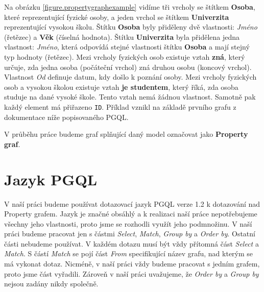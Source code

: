 Na obrázku \ref{figure.propertygraphexample} vidíme tři vrcholy se štítkem \textbf{Osoba}, které reprezentující fyzické osoby, a jeden vrchol se štítkem \textbf{Univerzita} reprezentující vysokou školu.
Štítku \textbf{Osoba} byly přiděleny dvě vlastnosti: \textit{Jméno} (řetězec) a \textbf{Věk} (číselná hodnota).
Štítku \textbf{Univerzita} byla přidělena jedna vlastnost: \textit{Jméno}, která odpovídá stejné vlastnosti štítku \textbf{Osoba} a mají stejný typ hodnoty (řetězec).
Mezi vrcholy fyzických osob existuje vztah \textbf{zná}, který určuje, zda jedna osoba (počáteční vrchol) zná druhou osobu (koncový vrchol).
Vlastnost \textit{Od} definuje datum, kdy došlo k poznání osoby.
Mezi vrcholy fyzických osob a vysokou školou existuje vztah \textbf{je studentem}, který říká, zda osoba studuje na dané vysoké škole.
Tento vztah nemá žádnou vlastnost.
Samotně pak každý element má přiřazeno \texttt{ID}.
Příklad vznikl na základě prvního grafu z dokumentace níže popisovaného PGQL.

V průběhu práce budeme graf splňující daný model označovat jako \textbf{Property graf}.

\section{Jazyk PGQL}
\label{req.pgql}

V naší práci budeme používat dotazovací jazyk PGQL \citep{pgql} verze 1.2 k dotazování nad Property grafem.
Jazyk je značné obsáhlý a k realizaci naší práce nepotřebujeme všechny jeho vlastnosti, proto jsme se rozhodli využít jeho podmnožinu.
V naší práci budeme pracovat jen s částmi \textit{Select}, \textit{Match}, \textit{Group by} a \textit{Order by}.
Ostatní části nebudeme používat.
V každém dotazu musí být vždy přítomná část \textit{Select} a \textit{Match}.
S částí \textit{Match} se pojí část \textit{From} specifikující název grafu, nad kterým se má vykonat dotaz.
Nicméně, v naší práci vždy budeme pracovat s jedním grafem, proto jsme část vyřadili. 
Zároveň v naší práci uvažujeme, že \textit{Order by} a \textit{Group by} nejsou zadány nikdy společně.

